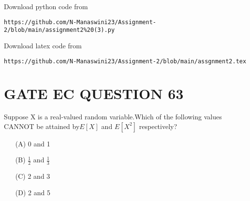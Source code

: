 \documentclass[journal,12pt,twocolumn]{IEEEtran}
\begin{document}
\renewcommand{\thefigure}{\theenumi}
\renewcommand{\thetable}{\theenumi}
Download python code from 
\begin{lstlisting}
https://github.com/N-Manaswini23/Assignment-2/blob/main/assignment2%20(3).py
\end{lstlisting}
%
Download latex code from
\begin{lstlisting}
https://github.com/N-Manaswini23/Assignment-2/blob/main/assgnment2.tex
\end{lstlisting}
%
\section*{GATE EC QUESTION 63}
Suppose X is a real-valued random variable.Which of the following values CANNOT be attained by$ E[X] $ and $ E[X^2] $ respectively?
\begin{enumerate}
\item[(A)] 0 and 1   
\item[(B)] $\frac{1}{2}$ and $\frac{1}{3}$
\item[(C)] 2 and 3
\item[(D)] 2 and 5
\end{enumerate}
\end{document}
